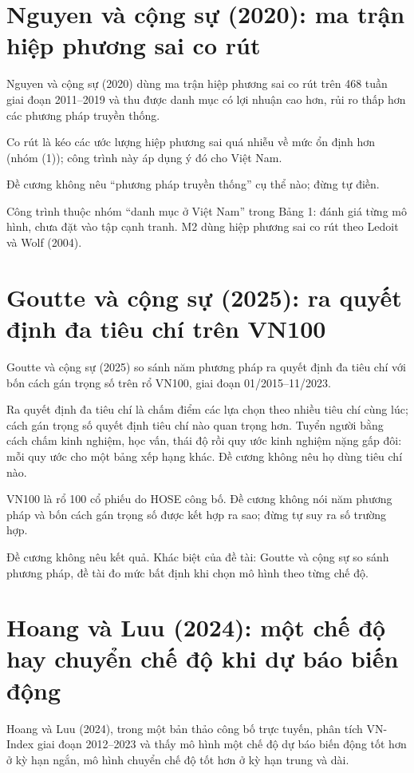 \section{Nguyen và cộng sự (2020): ma trận hiệp phương sai co rút}

Nguyen và cộng sự (2020) dùng ma trận hiệp phương sai co rút trên 468 tuần giai đoạn 2011--2019 và thu được danh mục có lợi nhuận cao hơn, rủi ro thấp hơn các phương pháp truyền thống.

Co rút là kéo các ước lượng hiệp phương sai quá nhiễu về mức ổn định hơn (nhóm (1)); công trình này áp dụng ý đó cho Việt Nam.

Đề cương không nêu “phương pháp truyền thống” cụ thể nào; đừng tự điền.

Công trình thuộc nhóm “danh mục ở Việt Nam” trong Bảng 1: đánh giá từng mô hình, chưa đặt vào tập cạnh tranh. M2 dùng hiệp phương sai co rút theo Ledoit và Wolf (2004).

\section{Goutte và cộng sự (2025): ra quyết định đa tiêu chí trên VN100}

Goutte và cộng sự (2025) so sánh năm phương pháp ra quyết định đa tiêu chí với bốn cách gán trọng số trên rổ VN100, giai đoạn 01/2015--11/2023.

Ra quyết định đa tiêu chí là chấm điểm các lựa chọn theo nhiều tiêu chí cùng lúc; cách gán trọng số quyết định tiêu chí nào quan trọng hơn. Tuyển người bằng cách chấm kinh nghiệm, học vấn, thái độ rồi quy ước kinh nghiệm nặng gấp đôi: mỗi quy ước cho một bảng xếp hạng khác. Đề cương không nêu họ dùng tiêu chí nào.

VN100 là rổ 100 cổ phiếu do HOSE công bố. Đề cương không nói năm phương pháp và bốn cách gán trọng số được kết hợp ra sao; đừng tự suy ra số trường hợp.

Đề cương không nêu kết quả. Khác biệt của đề tài: Goutte và cộng sự so sánh phương pháp, đề tài đo mức bất định khi chọn mô hình theo từng chế độ.

\section{Hoang và Luu (2024): một chế độ hay chuyển chế độ khi dự báo biến động}

Hoang và Luu (2024), trong một bản thảo công bố trực tuyến, phân tích VN-Index giai đoạn 2012--2023 và thấy mô hình một chế độ dự báo biến động tốt hơn ở kỳ hạn ngắn, mô hình chuyển chế độ tốt hơn ở kỳ hạn trung và dài.

